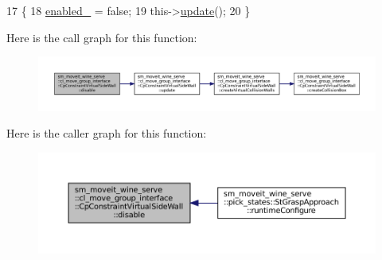 \begin{DoxyCode}
17         \{
18             \hyperlink{classsm__moveit__wine__serve_1_1cl__move__group__interface_1_1CpConstraintVirtualSideWall_a41d715b981297010db4d8760244b2e8c}{enabled\_} = \textcolor{keyword}{false};
19             this->\hyperlink{classsm__moveit__wine__serve_1_1cl__move__group__interface_1_1CpConstraintVirtualSideWall_a455681238d7baaaa5aa0f1e625864f3a}{update}();
20         \}
\end{DoxyCode}
Here is the call graph for this function\+:
\nopagebreak
\begin{figure}[H]
\begin{center}
\leavevmode
\includegraphics[width=350pt]{classsm__moveit__wine__serve_1_1cl__move__group__interface_1_1CpConstraintVirtualSideWall_a5187769bfe1dfd66e8c4ca0fe5ce614d_cgraph}
\end{center}
\end{figure}
Here is the caller graph for this function\+:
\nopagebreak
\begin{figure}[H]
\begin{center}
\leavevmode
\includegraphics[width=350pt]{classsm__moveit__wine__serve_1_1cl__move__group__interface_1_1CpConstraintVirtualSideWall_a5187769bfe1dfd66e8c4ca0fe5ce614d_icgraph}
\end{center}
\end{figure}
\mbox{\label{classsm__moveit__wine__serve_1_1cl__move__group__interface_1_1CpConstraintVirtualSideWall_a01cda66eb871a0cf5e24f84d9a06a343}} 
